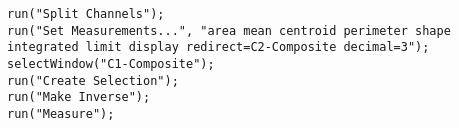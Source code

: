 \begin{lstlisting}
run("Split Channels");
run("Set Measurements...", "area mean centroid perimeter shape integrated limit display redirect=C2-Composite decimal=3");
selectWindow("C1-Composite");
run("Create Selection");
run("Make Inverse");
run("Measure");

\end{lstlisting}